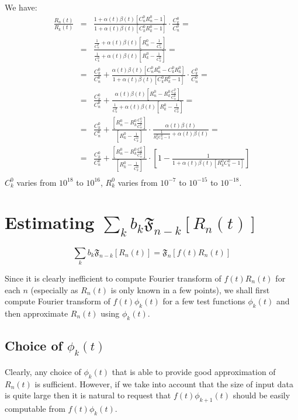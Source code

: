 \documentclass[12pt]{article}
\def\FTC#1#2{{\mathfrak F}_{#1}\left[#2\right]}
\begin{document}
We have:
{\large
$$
\begin{array}{rcl}
\frac{R_n(t)}{R_k(t)}&=&\frac{1+\alpha(t)\beta(t) [C^0_nR^0_n-1]}{1+\alpha(t)\beta(t) [C^0_kR^0_k-1]}
    \cdot \frac{C^0_k}{C^0_n}=\\
    &=&\frac{\frac{1}{C^0_n}+\alpha(t)\beta(t)\left[R^0_n-\frac{1}{C^0_n}\right]}{
    	\frac{1}{C^0_k}+\alpha(t)\beta(t)\left[R^0_k-\frac{1}{C^0_k}\right]}=\\
    &=&\frac{C^0_k}{C^0_n}+\frac{\alpha(t)\beta(t) [C^0_nR^0_n-C^0_kR^0_k]}{1+\alpha(t)\beta(t) [C^0_kR^0_k-1]}
    \cdot \frac{C^0_k}{C^0_n}=\\
    &=&\frac{C^0_k}{C^0_n}+\frac{\alpha(t)\beta(t) \left[R^0_n-R^0_k\frac{C^0_k}{C^0_n}\right]}{\frac{1}{C^0_k}+\alpha(t)\beta(t) \left[R^0_k-\frac{1}{C^0_k}\right]}
    =\\
    &=&\frac{C^0_k}{C^0_n}+\frac{\left[R^0_n-R^0_k\frac{C^0_k}{C^0_n}\right]}{\left[R^0_k-\frac{1}{C^0_k}\right]}
        \cdot\frac{\alpha(t)\beta(t)}{
    	\frac{1}{R^0_kC^0_k-1}+\alpha(t)\beta(t)}
    =\\
    &=&\frac{C^0_k}{C^0_n}+\frac{\left[R^0_n-R^0_k\frac{C^0_k}{C^0_n}\right]}{\left[R^0_k-\frac{1}{C^0_k}\right]}
        \cdot\left[1-\frac{1}{
    	1+\alpha(t)\beta(t)[R^0_kC^0_k-1]}\right]
    \\
\end{array}
$$
}
$C^0_k$ varies from $10^{18}$ to $10^{16}$, $R^0_k$ varies from $10^{-7}$ to 
$10^{-15}$ to $10^{-18}$.

\section{Estimating $\sum_k b_k \FTC{n-k}{R_n(t)}$}

$$
\sum_k b_k \FTC{n-k}{R_n(t)}=\FTC{n}{f(t)R_n(t)}
$$

Since it is clearly inefficient to compute Fourier transform of $f(t)R_n(t)$ for each $n$
(especially as $R_n(t)$ is only known in a few points), we shall first
compute Fourier transform of $f(t)\phi_k(t)$ for a few test functions $\phi_k(t)$
and then approximate $R_n(t)$ using $\phi_k(t)$.

\subsection{Choice of $\phi_k(t)$}
Clearly, any choice of $\phi_k(t)$ that is able to provide good approximation
of $R_n(t)$ is sufficient. However, if we take into account that the size of input 
data is quite large then it is natural to request that $f(t)\phi_{k+1}(t)$ 
should be easily computable from $f(t)\phi_{k}(t)$. 
\end{document}
